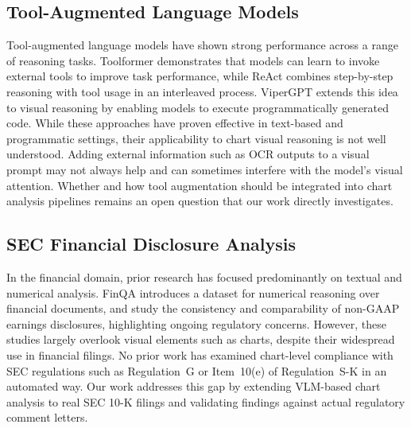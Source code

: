 \subsection{Tool-Augmented Language Models}

Tool-augmented language models have shown strong performance across a
range of reasoning tasks. Toolformer \cite{schick2023toolformer}
demonstrates that models can learn to invoke external tools to improve
task performance, while ReAct \cite{yao2023react} combines step-by-step
reasoning with tool usage in an interleaved process. ViperGPT
\cite{suris2023vipergpt} extends this idea to visual reasoning by
enabling models to execute programmatically generated code. While these
approaches have proven effective in text-based and programmatic
settings, their applicability to chart visual reasoning is not well
understood. Adding external information such as OCR outputs to a visual
prompt may not always help and can sometimes interfere with the model's
visual attention. Whether and how tool augmentation should be integrated
into chart analysis pipelines remains an open question that our work
directly investigates.

\subsection{SEC Financial Disclosure Analysis}

In the financial domain, prior research has focused predominantly on
textual and numerical analysis. FinQA \cite{chen2021finqa} introduces a
dataset for numerical reasoning over financial documents, and
\citet{black2021nongaap} study the consistency and comparability of
non-GAAP earnings disclosures, highlighting ongoing regulatory
concerns. However, these studies largely overlook visual elements such
as charts, despite their widespread use in financial filings. No prior
work has examined chart-level compliance with SEC regulations such as
Regulation~G or Item~10(e) of Regulation~S-K in an automated way. Our
work addresses this gap by extending VLM-based chart analysis to real
SEC 10-K filings and validating findings against actual regulatory
comment letters.

